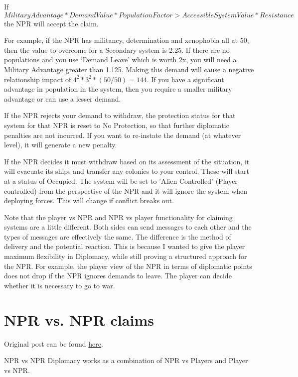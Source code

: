 \documentclass[../Aurora C# unofficial manual.tex]{subfiles}
\begin{document}
	If
	\[ Military Advantage * Demand Value * Population Factor > Accessible System Value * Resistance \]
	the NPR will accept the claim.
	
	For example, if the NPR has militancy, determination and xenophobia all at 50, then the value to overcome for a Secondary system is 2.25. If there are no populations and you use ‘Demand Leave’ which is worth 2x, you will need a Military Advantage greater than 1.125. Making this demand will cause a negative relationship impact of \( 4^{2} * 3^{2} * (50/50) = 144 \). If you have a significant advantage in population in the system, then you require a smaller military advantage or can use a lesser demand.
	
	If the NPR rejects your demand to withdraw, the protection status for that system for that NPR is reset to No Protection, so that further diplomatic penalties are not incurred. If you want to re-instate the demand (at whatever level), it will generate a new penalty.
	
	If the NPR decides it must withdraw based on its assessment of the situation, it will evacuate its ships and transfer any colonies to your control. These will start at a status of Occupied. The system will be set to 'Alien Controlled' (Player controlled) from the perspective of the NPR and it will ignore the system when deploying forces. This will change if conflict breaks out.
	
	Note that the player vs NPR and NPR vs player functionality for claiming systems are a little different. Both sides can send messages to each other and the types of messages are effectively the same. The difference is the method of delivery and the potential reaction. This is because I wanted to give the player maximum flexibility in Diplomacy, while still proving a structured approach for the NPR. For example, the player view of the NPR in terms of diplomatic points does not drop if the NPR ignores demands to leave. The player can decide whether it is necessary to go to war.
	
	\section{NPR vs. NPR claims}\label{4_npr_vs_npr_claims}
	Original post can be found
	\href{http://aurora2.pentarch.org/index.php?topic=8495.msg118398#msg118398}{here}.
	\newline\newline
	
	NPR vs NPR Diplomacy works as a combination of NPR vs Players and Player vs NPR.
	
\end{document}
